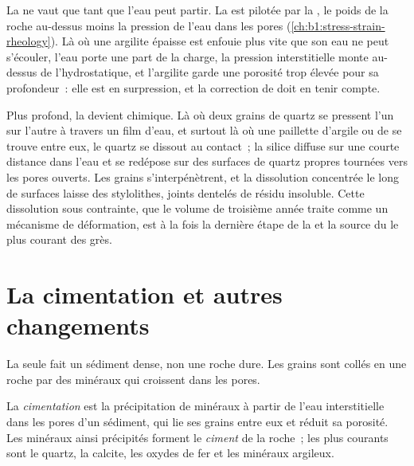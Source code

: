 La  ne vaut que tant que l'eau peut partir. La  est pilotée par
la , le poids de la roche au-dessus moins la pression de l'eau
dans les pores (\cref{ch:b1:stress-strain-rheology}). Là où une argilite épaisse est enfouie
plus vite que son eau ne peut s'écouler, l'eau porte une part de la charge, la pression
interstitielle monte au-dessus de l'hydrostatique, et l'argilite garde une porosité trop élevée pour
sa profondeur~: elle est en surpression, et la correction de  doit
en tenir compte.

Plus profond, la  devient chimique. Là où deux grains de quartz se pressent
l'un sur l'autre à travers un film d'eau, et surtout là où une paillette d'argile ou de  se trouve
entre eux, le quartz se dissout au contact~; la silice diffuse sur une courte distance
dans l'eau et se redépose sur des surfaces de quartz propres tournées vers les
pores ouverts. Les grains s'interpénètrent, et la dissolution concentrée le long de
surfaces laisse des stylolithes, joints dentelés de résidu insoluble. Cette dissolution
sous contrainte, que le volume de troisième année traite comme un mécanisme de déformation, est à la fois
la dernière étape de la  et la source du  le plus courant des
grès.

\section{La cimentation et autres changements}\label{sec:b1:diagenesis-basins:cementation}

La  seule fait un sédiment dense, non une roche dure. Les grains sont collés
en une roche par des minéraux qui croissent dans les pores.

\begin{definition}\label{def:b1:diagenesis-basins:cement}
La \emph{cimentation} est la précipitation de minéraux à partir de
l'eau interstitielle dans les pores d'un sédiment, qui lie ses grains entre eux et
réduit sa porosité. Les minéraux ainsi précipités forment le
\emph{ciment} de la roche~; les plus courants sont le quartz, la calcite,
les oxydes de fer et les minéraux argileux.
\end{definition}

